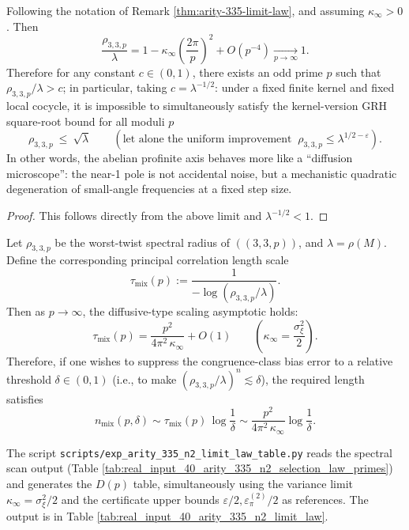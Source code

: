 \begin{corollary}\label{cor:arity-335-abelian-uniform-gap-nogo}
Following the notation of Remark \ref{thm:arity-335-limit-law}, and assuming \(\kappa_\infty>0\).
Then
\[
\frac{\rho_{3,3,p}}{\lambda}
=
1-\kappa_\infty\left(\frac{2\pi}{p}\right)^2+O(p^{-4})
\xrightarrow[p\to\infty]{}1.
\]
Therefore for any constant \(c\in(0,1)\), there exists an odd prime \(p\) such that \(\rho_{3,3,p}/\lambda>c\);
in particular, taking \(c=\lambda^{-1/2}\): under a fixed finite kernel and fixed local cocycle, it is impossible to simultaneously satisfy the kernel-version GRH square-root bound for all moduli \(p\)
\[
\rho_{3,3,p}\ \le\ \sqrt{\lambda}
\qquad(\text{let alone the uniform improvement }\ \rho_{3,3,p}\le \lambda^{1/2-\varepsilon}).
\]
In other words, the abelian profinite axis behaves more like a ``diffusion microscope'': the near-1 pole is not accidental noise, but a mechanistic quadratic degeneration of small-angle frequencies at a fixed step size.
\end{corollary}
\begin{proof}
This follows directly from the above limit and \(\lambda^{-1/2}<1\).
\end{proof}

\begin{remark}\label{cor:arity-335-diffusive-mixing}
Let $\rho_{3,3,p}$ be the worst-twist spectral radius of $((3,3,p))$, and $\lambda=\rho(M)$.
Define the corresponding principal correlation length scale
\[
\tau_{\mathrm{mix}}(p):=\frac{1}{-\log(\rho_{3,3,p}/\lambda)}.
\]
Then as $p\to\infty$, the diffusive-type scaling asymptotic holds:
\[
\tau_{\mathrm{mix}}(p)=\frac{p^2}{4\pi^2\,\kappa_\infty}+O(1)
\qquad\left(\kappa_\infty=\frac{\sigma_\xi^2}{2}\right).
\]
Therefore, if one wishes to suppress the congruence-class bias error to a relative threshold $\delta\in(0,1)$ (i.e., to make $(\rho_{3,3,p}/\lambda)^n\lesssim \delta$), the required length satisfies
\[
n_{\mathrm{mix}}(p,\delta)
\sim
\tau_{\mathrm{mix}}(p)\,\log\frac{1}{\delta}
\sim
\frac{p^2}{4\pi^2\,\kappa_\infty}\log\frac{1}{\delta}.
\]
\end{remark}

\begin{remark}\label{rem:arity-335-limit-law-table}
The script \texttt{scripts/exp\_arity\_335\_n2\_limit\_law\_table.py} reads the spectral scan output (Table \ref{tab:real_input_40_arity_335_n2_selection_law_primes}) and generates the \(D(p)\) table, simultaneously using the variance limit \(\kappa_\infty=\sigma_\xi^2/2\) and the certificate upper bounds \(\varepsilon/2,\varepsilon_\pi^{(2)}/2\) as references. The output is in Table \ref{tab:real_input_40_arity_335_n2_limit_law}.
\end{remark}

